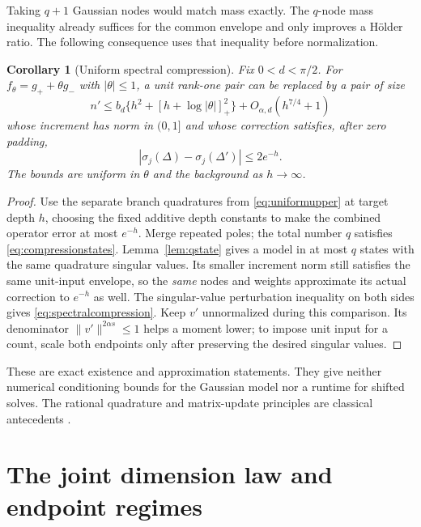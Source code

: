 \documentclass[11pt]{article}
\newtheorem{corollary}[theorem]{Corollary}
\numberwithin{equation}{section}
\begin{document}
Taking $q+1$ Gaussian nodes would match mass exactly. The $q$-node
mass inequality already suffices for the common envelope and only
improves a H\"older ratio.
The following consequence uses that inequality before normalization.

\begin{corollary}[Uniform spectral compression]\label{cor:compression}
Fix $0<d<\pi/2$. For $f_\theta=g_++\theta g_-$ with $|\theta|\le1$,
a unit rank-one pair can be replaced by a pair of size
\begin{equation}\label{eq:compressionstates}
 n'\le b_d\{h^2+[h+\log|\theta|]_+^2\}
                             +O_{\alpha,d}(h^{7/4}+1)
\end{equation}
whose increment has norm in $(0,1]$ and whose correction satisfies,
after zero padding,
\begin{equation}\label{eq:spectralcompression}
 |\sigma_j(\Delta)-\sigma_j(\Delta')|\le2e^{-h}.
\end{equation}
The bounds are uniform in $\theta$ and the background as $h\to\infty$.
\end{corollary}
\begin{proof}
Use the separate branch quadratures from \eqref{eq:uniformupper} at
target depth $h$, choosing the fixed additive depth constants to make
the combined operator error at most $e^{-h}$. Merge repeated poles;
the total number $q$ satisfies \eqref{eq:compressionstates}.
Lemma~\ref{lem:qstate} gives a model in at most $q$ states with the
same quadrature singular values. Its smaller increment norm still
satisfies the same unit-input envelope, so the \emph{same} nodes and
weights approximate its actual correction to $e^{-h}$ as well.
The singular-value perturbation inequality on both sides gives
\eqref{eq:spectralcompression}. Keep $v'$ unnormalized during this
comparison. Its denominator $\|v'\|^{2\alpha s}\le1$ helps a moment
lower; to impose unit input for a count, scale both endpoints only
after preserving the desired singular values.
\end{proof}

These are exact existence and approximation statements. They give
neither numerical conditioning bounds for the Gaussian model nor a
runtime for shifted solves. The rational quadrature and matrix-update
principles are classical antecedents \cite{Gautschi,BCKS}.

\section{The joint dimension law and endpoint regimes}
\end{document}
